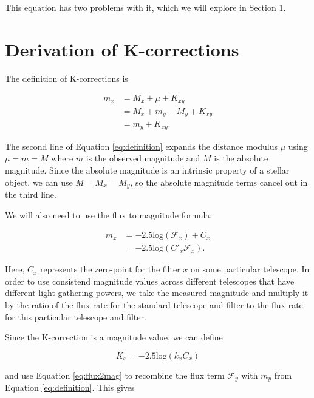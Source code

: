 \documentclass{article}
\begin{document}
This equation has two problems with it, which we will explore in Section
\ref{sec:derivation}.

\section{Derivation of K-corrections}
\label{sec:derivation}

The definition of K-corrections is

\begin{equation}
\begin{aligned}
\label{eq:definition}
  m_x &= M_x + \mu + K_{xy} \\
      &= M_x + m_y - M_y + K_{xy} \\
      &= m_y + K_{xy}.
\end{aligned}
\end{equation}

The second line of Equation \ref{eq:definition} expands the distance modulus
$\mu$ using $\mu = m = M$ where $m$ is the observed magnitude and $M$ is the
absolute magnitude. Since the absolute magnitude is an intrinsic property of a
stellar object, we can use $M = M_x = M_y$, so the absolute magnitude terms
cancel out in the third line.

We will also need to use the flux to magnitude formula:

\begin{equation}
\begin{aligned}
\label{eq:flux2mag}
  m_x &= -2.5 \text{log}(\mathcal{F}_x) + C_x \\
      &= -2.5 \text{log}(C'_x \mathcal{F}_x) .
\end{aligned}
\end{equation}

Here, $C_x$ represents the zero-point for the filter $x$ on some particular
telescope. In order to use consistend magnitude values across different
telescopes that have different light gathering powers, we take the measured
magnitude and multiply it by the ratio of the flux rate for the standard
telescope and filter to the flux rate for this particular telescope and
filter.

Since the K-correction is a magnitude value, we can define

\begin{equation}
K_x = -2.5\text{log}(k_x C_x)
\end{equation}

and use Equation \ref{eq:flux2mag} to recombine the flux term $\mathcal{F}_y$
with $m_y$ from Equation \ref{eq:definition}. This gives
\end{document}
